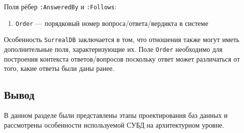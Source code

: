 Поля рёбер \texttt{:AnsweredBy} и \texttt{:Follows}:
\begin{enumerate}
    \item \texttt{Order} --- порядковый номер вопроса/ответа/вердикта в системе
\end{enumerate}

Особенность \texttt{SurrealDB} заключается в том, что отношения также могут иметь дополнительные поля, характеризующие их.
Поле \texttt{Order} необходимо для построения контекста ответов/вопросов поскольку ответ может различаться от того, какие ответы были даны ранее.

\subsection*{Вывод}
В данном разделе были представлены этапы проектирования баз данных и рассмотрены особенности используемой СУБД на архитектурном уровне.
